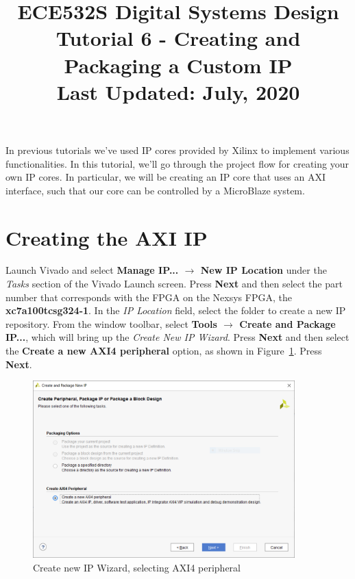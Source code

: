\documentclass[11pt]{article}
\title{ECE532S Digital Systems Design \\ \vspace{0.4cm}
       \Large Tutorial 6 - Creating and Packaging a Custom IP \\ \vspace{0.4cm}
       \small Last Updated: July, 2020}
\author{ }
\date{ }
\begin{document}
\maketitle
\vspace{-1cm}

In previous tutorials we've used IP cores provided by Xilinx to implement various functionalities. In this tutorial, we'll go through the project flow for creating your own IP cores. In particular, we will be creating an IP core that uses an AXI interface, such that our core can be controlled by a MicroBlaze system.




\section{Creating the AXI IP}
\label{sec:create_axi_ip}
Launch Vivado and select \textbf{Manage IP... $\rightarrow$ New IP Location} under the \textit{Tasks} section of the Vivado Launch screen. Press \textbf{Next} and then select the part number that corresponds with the FPGA on the Nexsys FPGA, the \textbf{xc7a100tcsg324-1}. In the \textit{IP Location} field, select the folder to create a new IP repository. From the window toolbar, select \textbf{Tools $\rightarrow$ Create and Package IP...}, which will bring up the \textit{Create New IP Wizard}. Press \textbf{Next} and then select the \textbf{Create a new AXI4 peripheral} option, as shown in Figure~\ref{fig:create_axi_ip}. Press \textbf{Next}.

\begin{figure}[!h]
    \centering
    \includegraphics[width=0.9\textwidth]{images/create_axi_ip.png}
    \caption{Create new IP Wizard, selecting AXI4 peripheral}
    \label{fig:create_axi_ip}
\end{figure}
\end{document}
